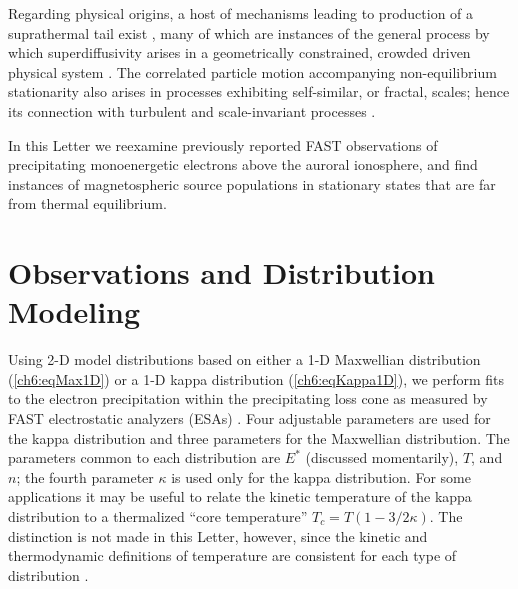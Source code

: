  Regarding physical origins, a host of mechanisms leading to
 production of a suprathermal tail exist \citep[e.g., review
 by][]{Pierrard2010}, many of which are instances of the general
 process by which superdiffusivity arises in a geometrically
 constrained, crowded driven physical system \citep{Benichou2013}.
 The correlated particle motion accompanying non-equilibrium
 stationarity also arises in processes exhibiting self-similar, or
 fractal, scales; hence its connection with turbulent and
 scale-invariant processes \citep{West1990,Treumann1999a,Leubner2004}.

 In this Letter we reexamine previously reported FAST observations of
 precipitating monoenergetic electrons above the auroral ionosphere,
 and find instances of magnetospheric source populations in stationary
 states that are far from thermal equilibrium.

  \section{Observations and Distribution Modeling}

  Using 2-D model distributions based on either a 1-D Maxwellian
  distribution (\ref{ch6:eqMax1D}) or a 1-D kappa distribution
  (\ref{ch6:eqKappa1D}), we perform fits to the electron precipitation
  within the precipitating loss cone as measured by FAST electrostatic
  analyzers (ESAs) \citep{Carlson2001}. Four adjustable parameters are
  used for the kappa distribution and three parameters for the
  Maxwellian distribution. The parameters common to each distribution
  are $E^*$ (discussed momentarily), $T$, and $n$; the fourth
  parameter $\kappa$ is used only for the kappa distribution. For some
  applications \citep[e.g.,][]{Sutherland2012} it may be useful to
  relate the kinetic temperature of the kappa distribution to a
  thermalized ``core temperature'' $T_c = T (1-3/2 \kappa)$. The
  distinction is not made in this Letter, however, since the kinetic
  and thermodynamic definitions of temperature are consistent for each
  type of distribution \citep{Livadiotis2010}.

